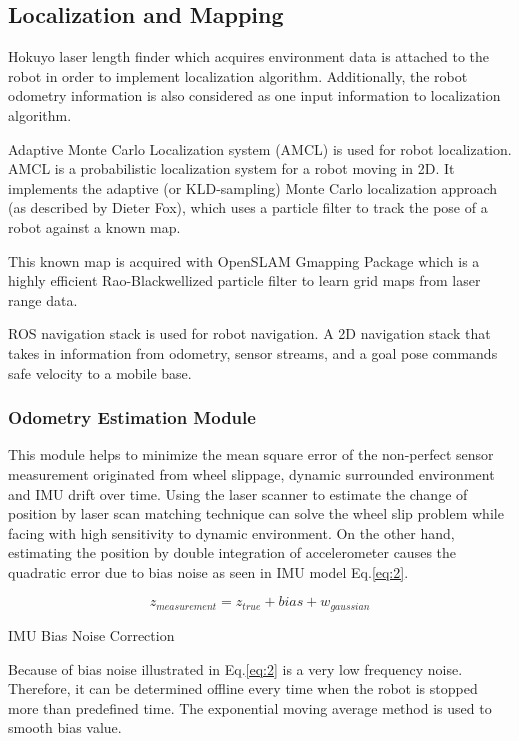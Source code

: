 \documentclass{llncs}
\begin{document}
\subsection{Localization and Mapping}

Hokuyo laser length finder which acquires environment data is attached to the robot in order to implement localization algorithm. Additionally, the robot odometry information is also considered as one input information to localization algorithm.

Adaptive Monte Carlo Localization system (AMCL) is used for robot localization. AMCL is a probabilistic localization system for a robot moving in 2D. It implements the adaptive (or KLD-sampling) Monte Carlo localization approach (as described by Dieter Fox), which uses a particle filter to track the pose of a robot against a known map.

This known map is acquired with OpenSLAM Gmapping Package which is a highly efficient Rao-Blackwellized particle filter to learn grid maps from laser range data.

ROS navigation stack is used for robot navigation. A 2D navigation stack that takes in information from odometry, sensor streams, and a goal pose commands safe velocity to a mobile base.

\subsubsection{Odometry Estimation Module}

This module helps to minimize the mean square error of the non-perfect sensor measurement originated from wheel slippage, dynamic surrounded environment and IMU drift over time. Using the laser scanner to estimate the change of position by laser scan matching technique can solve the wheel slip problem while facing with high sensitivity to dynamic environment. On the other hand, estimating the position by double integration of accelerometer causes the quadratic error due to bias noise as seen in IMU model Eq.\ref{eq:2}.

\begin{equation}
\label{eq:2}
z_{measurement} = z_{true} + bias + w_{gaussian}
\end{equation}

IMU Bias Noise Correction

Because of bias noise illustrated in Eq.\ref{eq:2} is a very low frequency noise. Therefore, it can be determined offline every time when the robot is stopped more than predefined time. The exponential moving average method is used to smooth bias value.
\end{document}
